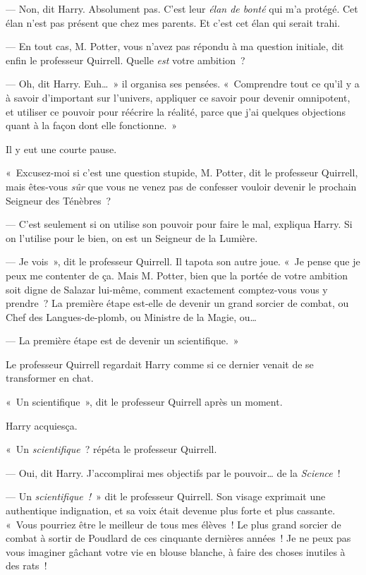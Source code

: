 --- Non, dit Harry.
Absolument pas.
C'est leur \emph{élan de bonté} qui m'a protégé.
Cet élan n'est pas présent que chez mes parents.
Et c'est cet élan qui serait trahi.

--- En tout cas, M. Potter, vous n'avez pas répondu à ma question initiale, dit enfin le professeur Quirrell.
Quelle \emph{est} votre ambition~?

--- Oh, dit Harry.
Euh…~» il organisa ses pensées.
«~Comprendre tout ce qu'il y a à savoir d'important sur l'univers, appliquer ce savoir pour devenir omnipotent, et utiliser ce pouvoir pour réécrire la réalité, parce que j'ai quelques objections quant à la façon dont elle fonctionne.~»

Il y eut une courte pause.

«~Excusez-moi si c'est une question stupide, M. Potter, dit le professeur Quirrell, mais êtes-vous \emph{sûr} que vous ne venez pas de confesser vouloir devenir le prochain Seigneur des Ténèbres~?

--- C'est seulement si on utilise son pouvoir pour faire le mal, expliqua Harry.
Si on l'utilise pour le bien, on est un Seigneur de la Lumière.

--- Je vois~», dit le professeur Quirrell.
Il tapota son autre joue.
«~Je pense que je peux me contenter de ça.
Mais M. Potter, bien que la portée de votre ambition soit digne de Salazar lui-même, comment exactement comptez-vous vous y prendre~?
La première étape est-elle de devenir un grand sorcier de combat, ou Chef des Langues-de-plomb, ou Ministre de la Magie, ou…

--- La première étape est de devenir un scientifique.~»

Le professeur Quirrell regardait Harry comme si ce dernier venait de se transformer en chat.

«~Un scientifique~», dit le professeur Quirrell après un moment.

Harry acquiesça.

«~Un \emph{scientifique}~? répéta le professeur Quirrell.

--- Oui, dit Harry.
J'accomplirai mes objectifs par le pouvoir… de la \emph{Science}~!

--- Un \emph{scientifique~!}~» dit le professeur Quirrell.
Son visage exprimait une authentique indignation, et sa voix était devenue plus forte et plus cassante.
«~Vous pourriez être le meilleur de tous mes élèves~!
Le plus grand sorcier de combat à sortir de Poudlard de ces cinquante dernières années~!
Je ne peux pas vous imaginer gâchant votre vie en blouse blanche, à faire des choses inutiles à des rats~!

